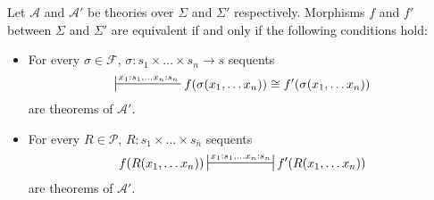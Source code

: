 \documentclass[reqno]{amsart}
\theoremstyle{definition}
\theoremstyle{remark}
\numberwithin{figure}{section}
\begin{document}
\begin{prop}[mor-eq]
Let $\mathcal{A}$ and $\mathcal{A}'$ be theories over $\Sigma$ and $\Sigma'$ respectively.
Morphisms $f$ and $f'$ between $\Sigma$ and $\Sigma'$ are equivalent if and only if the following conditions hold:
\begin{itemize}
\item For every $\sigma \in \mathcal{F}$, $\sigma : s_1 \times \ldots \times s_n \to s$ sequents
\[ \sststile{}{x_1 : s_1, \ldots x_n : s_n} f(\sigma(x_1, \ldots x_n)) \cong f'(\sigma(x_1, \ldots x_n)) \]
are theorems of $\mathcal{A}'$.
\item For every $R \in \mathcal{P}$, $R : s_1 \times \ldots \times s_n$ sequents
\[ f(R(x_1, \ldots x_n)) \ssststile{}{x_1 : s_1, \ldots x_n : s_n} f'(R(x_1, \ldots x_n)) \]
are theorems of $\mathcal{A}'$.
\end{itemize}
\end{prop}
\end{document}
